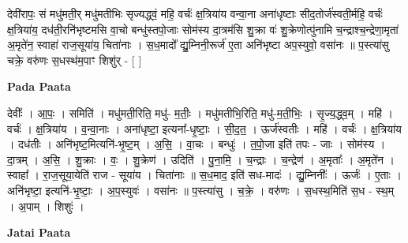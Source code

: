 \documentclass[17pt]{extarticle}
\begin{document}
देवी॑रापः॒ सं मधु॑मती॒र् मधु॑मतीभिः सृज्यद्ध्वं॒ महि॒ वर्चः॑ क्ष॒त्रिया॑य वन्वा॒ना अना॑धृष्टाः सीद॒तोर्ज॑स्वती॒र्महि॒ वर्चः॑ क्ष॒त्रिया॑य॒ दध॑ती॒रनि॑भृष्टमसि वा॒चो बन्धु॑स्तपो॒जाः सोम॑स्य दा॒त्रम॑सि शु॒क्रा वः॑ शु॒क्रेणोत्पु॑नामि च॒न्द्राश्च॒न्द्रेणा॒मृता॑ अ॒मृते॑न॒ स्वाहा॑ राज॒सूया॑य॒ चिता॑नाः । स॒ध॒मादो᳚ द्यु॒म्निनी॒रूर्ज॑ ए॒ता अनि॑भृष्टा अप॒स्युवो॒ वसा॑नः ॥ प॒स्त्या॑सु चक्रे॒ वरु॑णः स॒धस्थ॑म॒पाꣳ शिशु॑र् - [ ] \newline

\textbf{Pada Paata} \newline

देवीः᳚ । आ॒पः॒ । समिति॑ । मधु॑मती॒रिति॒ मधु॑- म॒तीः॒ । मधु॑मतीभि॒रिति॒ मधु॑-म॒ती॒भिः॒ । सृ॒ज्य॒द्ध्व॒म् । महि॑ । वर्चः॑ । क्ष॒त्रिया॑य । व॒न्वा॒नाः । अना॑धृष्टा॒ इत्यना᳚-धृ॒ष्टाः॒ । सी॒द॒त॒ । ऊर्ज॑स्वतीः । महि॑ । वर्चः॑ । क्ष॒त्रिया॑य । दध॑तीः । अनि॑भृष्ट॒मित्यनि॑-भृ॒ष्ट॒म् । अ॒सि॒ । वा॒चः । बन्धुः॑ । त॒पो॒जा इति॑ तपः - जाः । सोम॑स्य । दा॒त्रम् । अ॒सि॒ । शु॒क्राः । वः॒ । शु॒क्रेण॑ । उदिति॑ । पु॒ना॒मि॒ । च॒न्द्राः । च॒न्द्रेण॑ । अ॒मृताः᳚ । अ॒मृते॑न । स्वाहा᳚ । रा॒ज॒सूया॒येति॑ राज - सूया॑य । चिता॑नाः ॥ स॒ध॒माद॒ इति॑ सध-मादः॑ । द्यु॒म्निनीः᳚ । ऊर्जः॑ । ए॒ताः । अनि॑भृष्टा॒ इत्यनि॑-भृ॒ष्टाः॒ । अ॒प॒स्युवः॑ । वसा॑नः ॥ प॒स्त्या॑सु । च॒क्रे॒ । वरु॑णः । स॒धस्थ॒मिति॑ स॒ध - स्थ॒म् । अ॒पाम् । शिशुः॑ ।  \newline



\textbf{Jatai Paata} \newline
\end{document}
